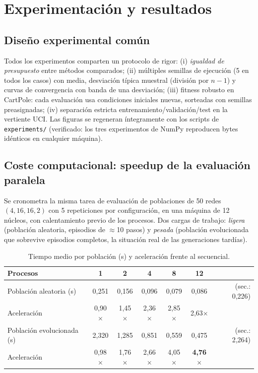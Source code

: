 \section{Experimentación y resultados}
\label{sec:experimentacion}

\subsection{Diseño experimental común}

Todos los experimentos comparten un protocolo de rigor: (i) \emph{igualdad de presupuesto} entre métodos comparados; (ii) múltiples semillas de ejecución (5 en todos los casos) con media, desviación típica muestral (división por $n-1$) y curvas de convergencia con banda de una desviación; (iii) fitness robusto en CartPole: cada evaluación usa condiciones iniciales nuevas, sorteadas con semillas preasignadas; (iv) separación estricta entrenamiento/validación/test en la vertiente UCI. Las figuras se regeneran íntegramente con los scripts de \texttt{experiments/} (verificado: los tres experimentos de NumPy reproducen bytes idénticos en cualquier máquina).

\subsection{Coste computacional: speedup de la evaluación paralela}

Se cronometra la misma tarea de evaluación de poblaciones de 50 redes $(4,16,16,2)$ con 5 repeticiones por configuración, en una máquina de 12 núcleos, con calentamiento previo de los procesos. Dos cargas de trabajo: \emph{ligera} (población aleatoria, episodios de $\approx$10 pasos) y \emph{pesada} (población evolucionada que sobrevive episodios completos, la situación real de las generaciones tardías).

\begin{table}[htbp]
  \centering
  \caption{Tiempo medio por población (s) y aceleración frente al secuencial.}
  \label{tab:speedup}
  \begin{tabular}{lcccccc}
    \toprule
    Procesos & 1 & 2 & 4 & 8 & 12 & \\
    \midrule
    Población aleatoria (s) & 0,251 & 0,156 & 0,096 & 0,079 & 0,086 & \multicolumn{1}{r}{(sec.: 0,226)} \\
    Aceleración & 0,90$\times$ & 1,45$\times$ & 2,36$\times$ & 2,85$\times$ & 2,63$\times$ & \\
    Población evolucionada (s) & 2,320 & 1,285 & 0,851 & 0,559 & 0,475 & \multicolumn{1}{r}{(sec.: 2,264)} \\
    Aceleración & 0,98$\times$ & 1,76$\times$ & 2,66$\times$ & 4,05$\times$ & \textbf{4,76$\times$} & \\
    \bottomrule
  \end{tabular}
\end{table}


